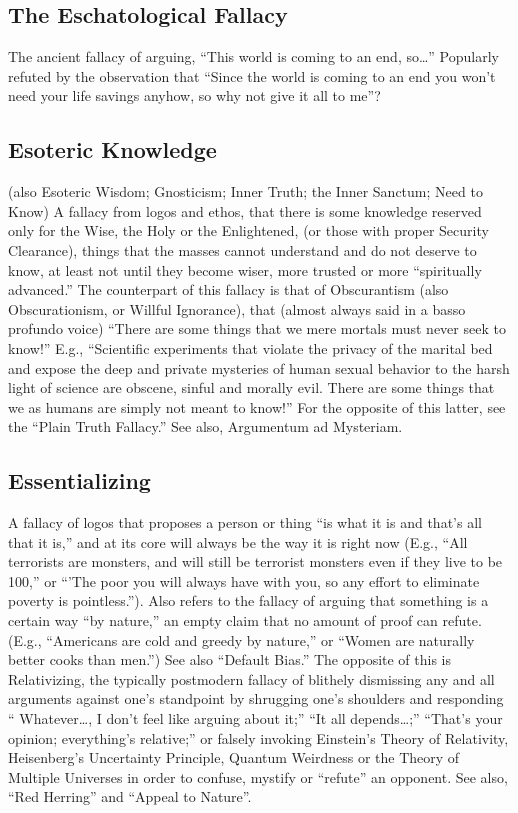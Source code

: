 \documentclass[10pt,a4paper,british]{article}
\begin{document}
\begin{multicols}{2}
    \subsection{The Eschatological Fallacy} The ancient fallacy of arguing, ``This world is coming to an end, so\ldots''  Popularly refuted by the observation that ``Since the world is coming to an end you won't need your life savings anyhow, so why not give it all to me''?  

    \subsection{Esoteric Knowledge} (also Esoteric Wisdom; Gnosticism; Inner Truth; the Inner Sanctum; Need to Know) A fallacy from logos and ethos, that there is some knowledge reserved only for the Wise, the Holy or the Enlightened, (or those with proper Security Clearance), things that the masses cannot understand and do not deserve to know, at least not until they become wiser, more trusted or more ``spiritually advanced.''  The counterpart of this fallacy is that of Obscurantism (also Obscurationism, or Willful Ignorance), that (almost always said in a basso profundo voice) ``There are some things that we mere mortals must never seek to know!'' E.g., ``Scientific experiments that violate the privacy of the marital bed and expose  the deep and private mysteries of human sexual behavior to the harsh light of science are obscene, sinful and morally evil. There are some things that we as humans are simply not meant to know!'' For the opposite of this latter, see the ``Plain Truth Fallacy.'' See also, Argumentum ad Mysteriam.  

    \subsection{Essentializing} A fallacy of logos that proposes a person or thing “is what it is and that’s all that it is,” and at its core will always be the way it is right now (E.g., ``All terrorists are monsters, and will still be terrorist monsters even if they live to be 100,'' or ``'The poor you will always have with you, so any effort to eliminate poverty is pointless.''). Also refers to the fallacy of arguing that something is a certain way ``by nature,'' an empty claim that no amount of proof can refute. (E.g., ``Americans are cold and greedy by nature,'' or ``Women are naturally better cooks than men.'') See also ``Default Bias.''  The opposite of this is Relativizing, the typically postmodern fallacy of blithely dismissing any and all arguments against one's standpoint by shrugging one's shoulders and responding `` Whatever\ldots, I don't feel like arguing about it;'' ``It all depends\ldots;'' ``That's your opinion; everything's relative;'' or falsely invoking Einstein's Theory of Relativity, Heisenberg's Uncertainty Principle, Quantum Weirdness or the Theory of Multiple Universes in order to confuse, mystify or ``refute'' an opponent. See also, ``Red Herring'' and  ``Appeal to Nature''.  


\end{multicols}
\end{document}
